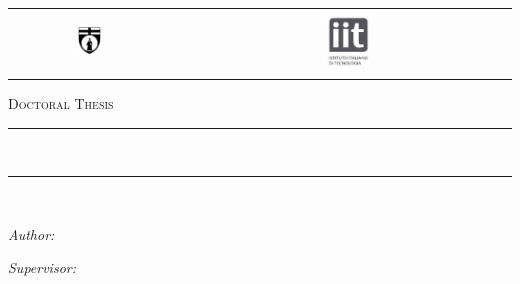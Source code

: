 \begin{titlepage}
\addtocounter{page}{-1}
\begin{center}

\begin{tabular}{ccc}
    \includegraphics[align=c, width=0.17\textwidth]{Covers/unige_logo_bw.png} &  
    {\scshape \huge \darkred{\univname}} & %
    \includegraphics[align=c, width=0.17\textwidth]{Covers/iit_logo.png}
\end{tabular}

\vspace{0.5cm}
\textsc{\Large Doctoral Thesis}\\[0.5cm] %


\rule[0.4cm]{13cm}{0.1pt}\\%
{\huge \bfseries \ttitle\par}\vspace{0.4cm} %
\rule{13cm}{0.1pt}\\ \vspace{1.5cm}
 
\begin{minipage}[t]{0.4\textwidth}
\begin{flushleft} \large
\emph{Author:}\\
\href{http://#}{\authorname} %
\end{flushleft}
\end{minipage}
\begin{minipage}[t]{0.4\textwidth}
\begin{flushright} \large
\emph{Supervisor:} \\
\href{https://www.iit.it/people/tommaso-fellin}{\supname} \\ %
\end{flushright}
\end{minipage}\\[1.6cm]
 

\end{center}
\end{titlepage}
